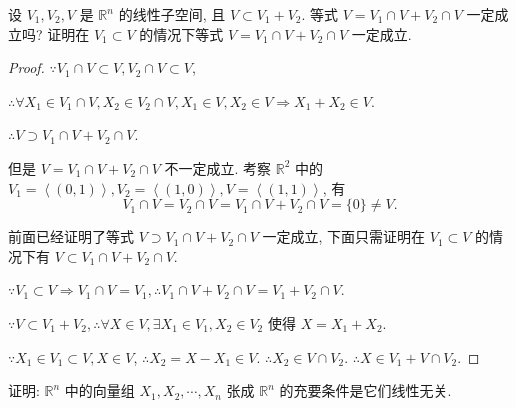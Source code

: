 \documentclass{ctexart}
\begin{document}
\begin{exercise}%
    设 $V_1,V_2,V$ 是 $\mathbb{R}^n$ 的线性子空间, 且 $V\subset V_1+V_2$. 等式 $V=V_1\cap V+V_2\cap V$ 一定成立吗? 证明在 $V_1\subset V$ 的情况下等式 $V=V_1\cap V+V_2\cap V$ 一定成立.
\end{exercise}
\begin{proof}
    $\because V_1\cap V\subset V,V_2\cap V\subset V$,

    $\therefore\forall X_1\in V_1\cap V,X_2\in V_2\cap V,X_1\in V,X_2\in V\Rightarrow X_1+X_2\in V$.

    $\therefore V\supset V_1\cap V+V_2\cap V$.

    但是 $V=V_1\cap V+V_2\cap V$ 不一定成立. 考察 $\mathbb{R}^2$ 中的 $V_1=\left<(0,1)\right>,V_2=\left<(1,0)\right>,V=\left<(1,1)\right>$, 有
    \[V_1\cap V=V_2\cap V=V_1\cap V+V_2\cap V=\{0\}\neq V.\]

    前面已经证明了等式 $V\supset V_1\cap V+V_2\cap V$ 一定成立, 下面只需证明在 $V_1\subset V$ 的情况下有 $V\subset V_1\cap V+V_2\cap V$.

    $\because V_1\subset V\Rightarrow V_1\cap V=V_1,\therefore V_1\cap V+V_2\cap V=V_1+V_2\cap V$.

    $\because V\subset V_1+V_2,\therefore\forall X\in V,\exists X_1\in V_1,X_2\in V_2$ 使得 $X=X_1+X_2$.

    $\because X_1\in V_1\subset V,X\in V$, $\therefore X_2=X-X_1\in V$. $\therefore X_2\in V\cap V_2$. $\therefore X\in V_1+V\cap V_2$.
\end{proof}
\addtocounter{exercise}{2}
\begin{exercise}%
    证明: $\mathbb{R}^n$ 中的向量组 $X_1,X_2,\cdots,X_n$ 张成 $\mathbb{R}^n$ 的充要条件是它们线性无关.
\end{exercise}
\end{document}
